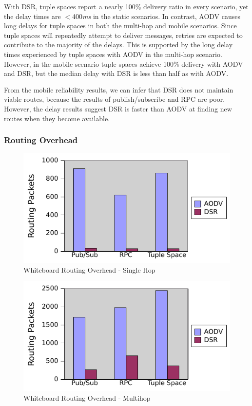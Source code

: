 With DSR, tuple spaces report a nearly 100\% delivery ratio in every scenario, yet the delay times are $<$400\textit{ms} in the static scenarios. In contrast, AODV causes long delays for tuple spaces in both the multi-hop and mobile scenarios. Since tuple spaces will repeatedly attempt to deliver messages, retries are expected to contribute to the majority of the delays. This is supported by the long delay times experienced by tuple spaces with AODV in the multi-hop scenario. However, in the mobile scenario tuple spaces achieve 100\% delivery with AODV and DSR, but the median delay with DSR is less than half as with AODV.

From the mobile reliability results, we can infer that DSR does not maintain viable routes, because the results of publish/subscribe and RPC are poor. However, the delay results suggest DSR is faster than AODV at finding new routes when they become available.


\subsubsection{Routing Overhead}\label{sec:routing}

\begin{figure}
\centering
\includegraphics[scale = .75]{figures/single-hop-routing.pdf}
\caption{Whiteboard Routing Overhead - Single Hop}
\label{fig:wbrouting-sh}
\end{figure}

\begin{figure}
\centering
\includegraphics[scale = .75]{figures/multi-hop-routing.pdf}
\caption{Whiteboard Routing Overhead - Multihop}
\label{fig:wbrouting-mh}
\end{figure}

